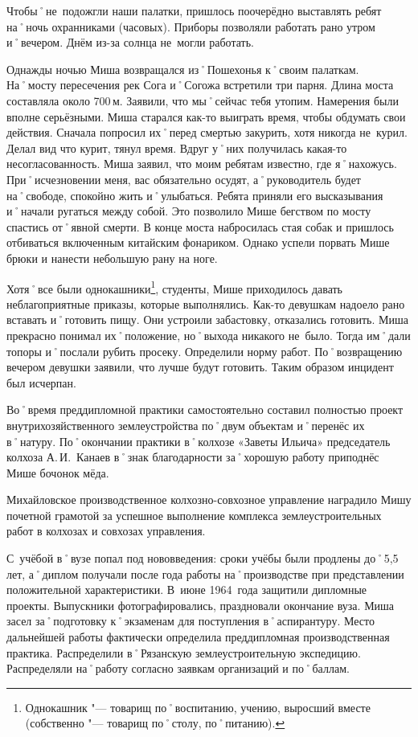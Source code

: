 Чтобы˚не~подожгли наши палатки, пришлось поочерёдно выставлять ребят на˚ночь охранниками (часовых). Приборы позволяли работать рано утром и˚вечером. Днём из-за солнца не~могли работать. 

Однажды ночью Миша возвращался из˚Пошехонья к˚своим палаткам. На˚мосту пересечения рек Сога и˚Согожа встретили три парня. Длина моста составляла около 700\,м. Заявили, что мы˚сейчас тебя утопим. Намерения были вполне серьёзными. Миша старался как-то выиграть время, чтобы обдумать свои действия. Сначала попросил их˚перед смертью закурить, хотя никогда не~курил. Делал вид что курит, тянул время. Вдруг у˚них получилась какая-то несогласованность. Миша заявил, что моим ребятам известно, где я˚нахожусь. При˚исчезновении меня, вас обязательно осудят, а˚руководитель будет на˚свободе, спокойно жить и˚улыбаться. Ребята приняли его высказывания и˚начали ругаться между собой. Это позволило Мише бегством по мосту спастись от˚явной смерти. В конце моста набросилась стая собак и пришлось отбиваться включенным китайским фонариком. Однако успели порвать Мише брюки и нанести небольшую рану на ноге.

Хотя˚все были однокашники\footnote{Однокашник "--- товарищ по˚воспитанию, учению, выросший вместе (собственно "--- товарищ по˚столу, по˚питанию).}, студенты, Мише приходилось давать неблагоприятные приказы, которые выполнялись. Как-то девушкам надоело рано вставать и˚готовить пищу. Они устроили забастовку, отказались готовить. Миша прекрасно понимал их˚положение, но˚выхода никакого не~было. Тогда им˚дали топоры и˚послали рубить просеку. Определили норму работ. По˚возвращению вечером девушки заявили, что лучше будут готовить. Таким образом инцидент был исчерпан. 

Во˚время преддипломной практики самостоятельно составил полностью проект внутрихозяйственного землеустройства по˚двум объектам и˚перенёс их в˚натуру. По˚окончании практики в˚колхозе «Заветы Ильича» председатель колхоза А.\,И.~Канаев в˚знак благодарности за˚хорошую работу приподнёс Мише бочонок мёда.

Михайловское производственное колхозно-совхозное управление наградило Мишу почетной грамотой за успешное выполнение комплекса землеустроительных работ в колхозах и совхозах управления.

С~учёбой в˚вузе попал под нововведения: сроки учёбы были продлены до˚5,5 лет, а˚диплом получали после года работы на˚производстве при представлении положительной характеристики. В~июне 1964~года защитили дипломные проекты. Выпускники фотографировались, праздновали окончание вуза. Миша засел за˚подготовку к˚экзаменам для поступления в˚аспирантуру. Место дальнейшей работы фактически определила преддипломная производственная практика. Распределили в˚Рязанскую землеустроительную экспедицию. Распределяли на˚работу согласно заявкам организаций и по˚баллам.

